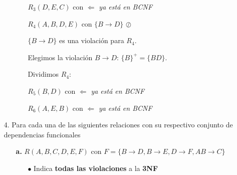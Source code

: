 \documentclass[12pt, letterpaper]{article}
\begin{document}
\begin{itemize}
\begin{itemize}
\begin{itemize}
                                            $R_{3}(D,E,C)$ con  \checkmark $\Leftarrow$ \textit{ya está en BCNF} \vspace{.1cm}

                                            $R_{4}(A,B,D,E)$ con $\{B \rightarrow D\}$ $\oslash$ \vspace{.3cm}

                                            $\{B \rightarrow D\}$ es una violación para $R_{4}$.

                                            Elegimos la violación $B \rightarrow D$: $\{B\}^+=\{BD\}$. \vspace{.3cm}

                                            Dividimos $R_{4}$: \vspace{.2cm}

                                            $R_{5}(B,D)$ con  \checkmark $\Leftarrow$ \textit{ya está en BCNF} \vspace{.1cm}

                                            $R_{6}(A,E,B)$ con  \checkmark $\Leftarrow$ \textit{ya está en BCNF}

                    \end{itemize}

            \end{itemize}
            
        \item[4.]   Para cada una de las siguientes relaciones con su respectivo 
                    conjunto de dependencias funcionales

            \begin{itemize}

                \item[\textbf{a.}]  $R(A,B,C,D,E,F)$ con $F = \{B \rightarrow D, 
                                    B \rightarrow E, D \rightarrow F,
                                    AB \rightarrow C\}$
                
                    \begin{itemize}

                        \item[$\bullet$] Indica \textbf{todas las violaciones} a 
                                        la \textbf{3NF} \vspace{.1cm}


\end{itemize}
\end{itemize}
\end{itemize}
\end{document}
